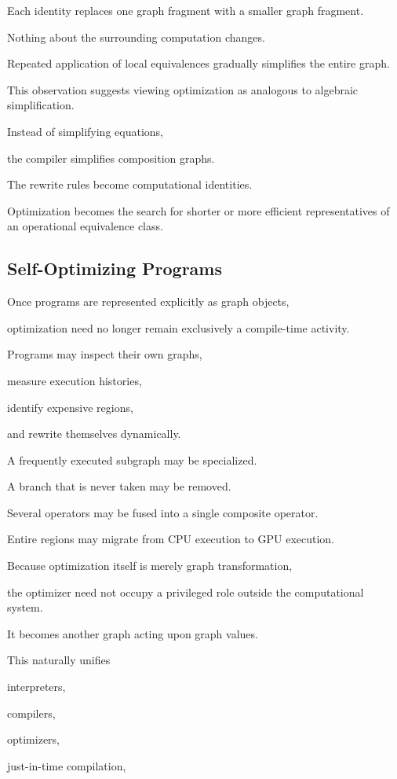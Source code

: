 \documentclass[12pt,oneside]{article}
\begin{document}
Each identity replaces one graph fragment with a smaller graph fragment.

Nothing about the surrounding computation changes.

Repeated application of local equivalences gradually simplifies the entire graph.

This observation suggests viewing optimization as analogous to algebraic simplification.

Instead of simplifying equations,

the compiler simplifies composition graphs.

The rewrite rules become computational identities.

Optimization becomes the search for shorter or more efficient representatives of an operational equivalence class.

\subsection{Self-Optimizing Programs}

Once programs are represented explicitly as graph objects,

optimization need no longer remain exclusively a compile-time activity.

Programs may inspect their own graphs,

measure execution histories,

identify expensive regions,

and rewrite themselves dynamically.

A frequently executed subgraph may be specialized.

A branch that is never taken may be removed.

Several operators may be fused into a single composite operator.

Entire regions may migrate from CPU execution to GPU execution.

Because optimization itself is merely graph transformation,

the optimizer need not occupy a privileged role outside the computational system.

It becomes another graph acting upon graph values.

This naturally unifies

interpreters,

compilers,

optimizers,

just-in-time compilation,
\end{document}
